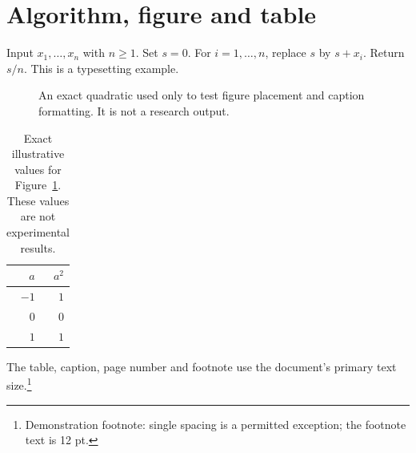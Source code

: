 \section{Algorithm, figure and table}
\begin{algorithm}
Input $x_1,\ldots,x_n$ with $n\geq1$. Set $s=0$. For $i=1,\ldots,n$,
replace $s$ by $s+x_i$. Return $s/n$. This is a typesetting example.
\end{algorithm}
\begin{figure}[htbp]
\centering
{}
\caption[Demonstration quadratic]{An exact quadratic used only to test figure
placement and caption formatting. It is not a research output.}
\label{fig:demo}
\end{figure}
\begin{table}[htbp]
\centering
\caption[Demonstration values]{Exact illustrative values for Figure~\ref{fig:demo}.
These values are not experimental results.}
\label{tab:demo}
\begin{singlespace}
\begin{tabular}{rr}\toprule
$a$ & $a^2$ \\\midrule
$-1$ & $1$ \\
$0$ & $0$ \\
$1$ & $1$ \\\bottomrule
\end{tabular}
\end{singlespace}
\end{table}
The table, caption, page number and footnote use the document's primary
text size.\footnote{Demonstration footnote: single spacing is a permitted
exception; the footnote text is 12 pt.}
